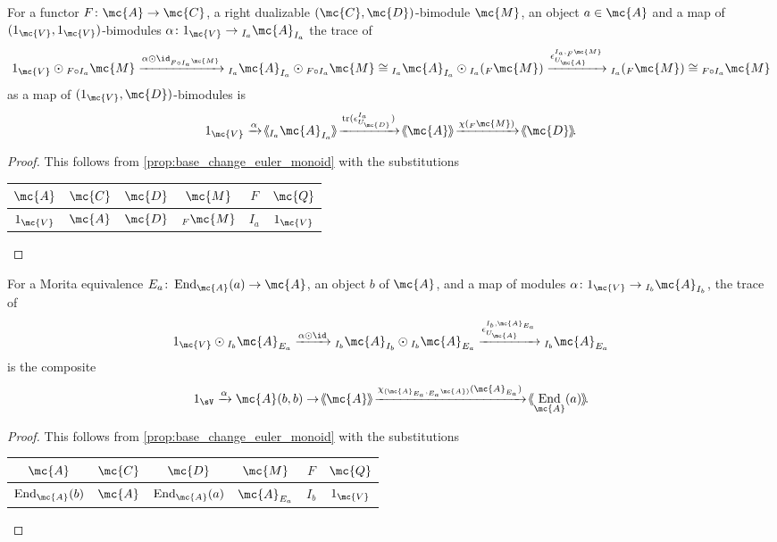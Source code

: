 \documentclass[11pt]{amsart}
\newcommand{\xto}{\xrightarrow}
\DeclareMathOperator{\End}{End}
\DeclareMathOperator{\tr}{tr}
\newcommand{\rbm}[4]{{#1}^{#2}_{#4}} %
\newcommand{\rbmm}[5]{{#1}^{{#2},{#5}}_{{#4}}} %
\def\shvar#1#2{{\ensuremath{%
  \hspace{1mm}\makebox[-1mm]{$#1\langle$}\makebox[0mm]{$#1\langle$}\hspace{1mm}%
  {#2}%
  \makebox[1mm]{$#1\rangle$}\makebox[0mm]{$#1\rangle$}%
}}}
\def\sh{\shvar{}}
\begin{document}
\begin{cor}
For a functor  $F\colon \mc{A}\to \mc{C}$, a right dualizable $(\mc{C},\mc{D})$-bimodule $\mc{M}$, 
an object $a\in \mc{A}$ and a map of $(1_\mc{V},1_\mc{V})$-{bimodules} 
 $\alpha \colon 1_\mc{V}\to {_{I_a}\mc{A}_{I_a}}$
the trace of 
\[1_\mc{V}\odot {_{F\circ I_a}\mc{M}}\xto{\alpha \odot \id_{{_{F\circ I_a}\mc{M}}}} 
{_{I_a}\mc{A}_{I_a}}\odot {_{F\circ I_a}\mc{M}}
\cong 
{_{I_a}\mc{A}_{I_a}}\odot {_{I_a}({_{F}\mc{M}})}
\xto{\rbmm{\epsilon}{I_a}{\mc{A}}{U_\mc{A}}{_F\mc{M}}}
 {_{I_a}({_{F}\mc{M}})}\cong {_{F\circ I_a} \mc{M}}\]
as a map of $(1_{\mc{V}},\mc{D})$-bimodules is 
\[{1_\mc{V}\xto\alpha
\sh{{_{I_a}\mc{A}_{I_a}}}\xto{\tr(\rbm{\epsilon}{I_a}{\mc{B}}{U_\mc{D}})}
\sh{\mc{A}}\xto{\chi(_F\mc{M})} \sh{\mc{D}}.
}\]
\end{cor}
\begin{proof}
This follows from \cref{prop:base_change_euler_monoid} with the substitutions
\begin{center}
\begin{tabular}{c|c|c|c|c|c}
$\mc{A}$
&$\mc{C}$
&$\mc{D}$
&$\mc{M}$
&$F$
&$\mc{Q}$
\\
\hline
$1_\mc{V}$
&
$\mc{A}$
&$\mc{D}$
&${_F\mc{M}}$
&$I_a$
&$1_\mc{V}$
\end{tabular}
\end{center}
\end{proof}


\begin{thm} \label{lem:base_change_euler_inverse}
For a Morita equivalence $E_a\colon \End_{\mc{A}}(a)\to \mc{A}$, an object $b$ of $\mc{A}$,  and a map of modules $\alpha\colon 1_{\mc{V}}\to  {_{I_b}\mc{A}_{I_b}}$, the trace of \[1_\mc{V}\odot  {_{I_b} \mc{A}_{E_a}} \xto{\alpha \odot \id} {_{I_b}\mc{A}_{I_b}}\odot  {_{I_b}\mc{A}_{E_a}}  \xto{\rbmm{\epsilon}{I_b}{\mc{A}}{U_\mc{A}}{\mc{A}_{E_a}}}  {_{I_b}\mc{A}_{E_a}} \]
is
the composite 
\[1_{\sV}\xto{\alpha}\mc{A}(b,b)
\to  \sh{\mc{A}}\xto{\chi_{(\mc{A}_{E_a},{_{E_a}\mc{A}})} (\mc{A}_{E_a})} \sh{\End_{\mc{A}}(a)}.\]
 \end{thm}

\begin{proof}
This follows from  \cref{prop:base_change_euler_monoid} with the substitutions
\begin{center}
\begin{tabular}{c|c|c|c|c|c}
$\mc{A}$
&$\mc{C}$
&$\mc{D}$
&$\mc{M}$
&$F$
&$\mc{Q}$
\\
\hline
$\End_\mc{A}(b)$
&$\mc{A}$
&$\End_\mc{A}(a)$
&$ \mc{A}_{E_a}$
&$I_b$
&$1_\mc{V}$
\end{tabular}
\end{center}
\end{proof}
\end{document}
